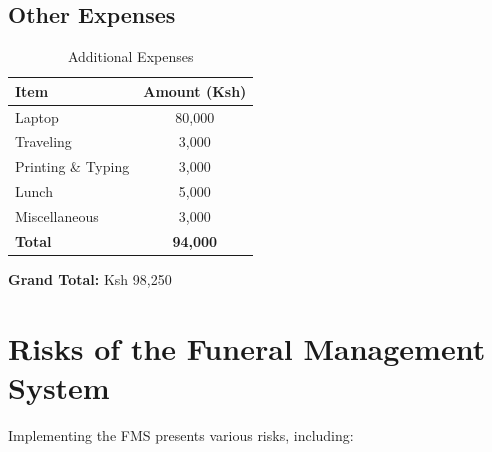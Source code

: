 \documentclass[a4paper,12pt]{report}
\begin{document}
\subsection*{Other Expenses}
\begin{table}[h!]
    \centering
    \begin{tabular}{|l|c|}
        \hline
        \textbf{Item} & \textbf{Amount (Ksh)} \\
        \hline
        Laptop & 80,000 \\
        Traveling & 3,000 \\
        Printing \& Typing & 3,000 \\
        Lunch & 5,000 \\
        Miscellaneous & 3,000 \\
        \hline
        \textbf{Total} & \textbf{94,000} \\
        \hline
    \end{tabular}
    \caption{Additional Expenses}
    \label{table:other_expenses}
\end{table}

\noindent \textbf{Grand Total:} Ksh 98,250

\section{Risks of the Funeral Management System}
Implementing the FMS presents various risks, including:
\end{document}
